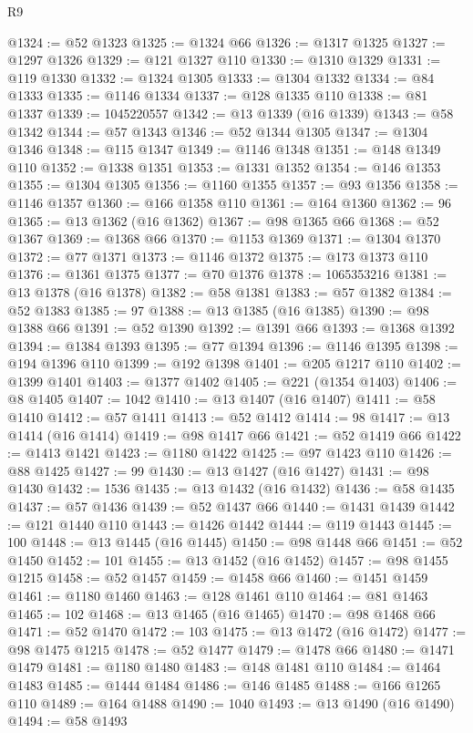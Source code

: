 \begin{lexlean}{R9}
\begin{coremodule}
@1324 := @52 @1323
@1325 := @1324 @66
@1326 := @1317 @1325
@1327 := @1297 @1326
@1329 := @121 @1327 @110
@1330 := @1310 @1329
@1331 := @119 @1330
@1332 := @1324 @1305
@1333 := @1304 @1332
@1334 := @84 @1333
@1335 := @1146 @1334
@1337 := @128 @1335 @110
@1338 := @81 @1337
@1339 := 1045220557
@1342 := @13 @1339 (@16 @1339)
@1343 := @58 @1342
@1344 := @57 @1343
@1346 := @52 @1344 @1305
@1347 := @1304 @1346
@1348 := @115 @1347
@1349 := @1146 @1348
@1351 := @148 @1349 @110
@1352 := @1338 @1351
@1353 := @1331 @1352
@1354 := @146 @1353
@1355 := @1304 @1305
@1356 := @1160 @1355
@1357 := @93 @1356
@1358 := @1146 @1357
@1360 := @166 @1358 @110
@1361 := @164 @1360
@1362 := 96
@1365 := @13 @1362 (@16 @1362)
@1367 := @98 @1365 @66
@1368 := @52 @1367
@1369 := @1368 @66
@1370 := @1153 @1369
@1371 := @1304 @1370
@1372 := @77 @1371
@1373 := @1146 @1372
@1375 := @173 @1373 @110
@1376 := @1361 @1375
@1377 := @70 @1376
@1378 := 1065353216
@1381 := @13 @1378 (@16 @1378)
@1382 := @58 @1381
@1383 := @57 @1382
@1384 := @52 @1383
@1385 := 97
@1388 := @13 @1385 (@16 @1385)
@1390 := @98 @1388 @66
@1391 := @52 @1390
@1392 := @1391 @66
@1393 := @1368 @1392
@1394 := @1384 @1393
@1395 := @77 @1394
@1396 := @1146 @1395
@1398 := @194 @1396 @110
@1399 := @192 @1398
@1401 := @205 @1217 @110
@1402 := @1399 @1401
@1403 := @1377 @1402
@1405 := @221 (@1354 @1403)
@1406 := @8 @1405
@1407 := 1042
@1410 := @13 @1407 (@16 @1407)
@1411 := @58 @1410
@1412 := @57 @1411
@1413 := @52 @1412
@1414 := 98
@1417 := @13 @1414 (@16 @1414)
@1419 := @98 @1417 @66
@1421 := @52 @1419 @66
@1422 := @1413 @1421
@1423 := @1180 @1422
@1425 := @97 @1423 @110
@1426 := @88 @1425
@1427 := 99
@1430 := @13 @1427 (@16 @1427)
@1431 := @98 @1430
@1432 := 1536
@1435 := @13 @1432 (@16 @1432)
@1436 := @58 @1435
@1437 := @57 @1436
@1439 := @52 @1437 @66
@1440 := @1431 @1439
@1442 := @121 @1440 @110
@1443 := @1426 @1442
@1444 := @119 @1443
@1445 := 100
@1448 := @13 @1445 (@16 @1445)
@1450 := @98 @1448 @66
@1451 := @52 @1450
@1452 := 101
@1455 := @13 @1452 (@16 @1452)
@1457 := @98 @1455 @1215
@1458 := @52 @1457
@1459 := @1458 @66
@1460 := @1451 @1459
@1461 := @1180 @1460
@1463 := @128 @1461 @110
@1464 := @81 @1463
@1465 := 102
@1468 := @13 @1465 (@16 @1465)
@1470 := @98 @1468 @66
@1471 := @52 @1470
@1472 := 103
@1475 := @13 @1472 (@16 @1472)
@1477 := @98 @1475 @1215
@1478 := @52 @1477
@1479 := @1478 @66
@1480 := @1471 @1479
@1481 := @1180 @1480
@1483 := @148 @1481 @110
@1484 := @1464 @1483
@1485 := @1444 @1484
@1486 := @146 @1485
@1488 := @166 @1265 @110
@1489 := @164 @1488
@1490 := 1040
@1493 := @13 @1490 (@16 @1490)
@1494 := @58 @1493

\end{coremodule}
\end{lexlean}
